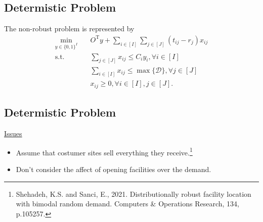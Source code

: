 \documentclass{beamer}
\newcommand{\T}{\mathrm{T}}
\newcommand{\Dcal}{\mathcal{D}}
\begin{document}
\subsection{Determistic Problem}
\begin{frame}[allowframebreaks]
	The non-robust problem is represented by
	\begin{subequations}
		\begin{align*}
			\min_{y \in \{0, 1\}^{I}} &\quad O^\T y + \sum_{i \in [I]} \sum_{j \in [J]} (t_{ij} - r_j) x_{ij} \\
			\text{s.t.} &\quad \sum_{j \in [J]} x_{ij} \le C_i y_i, \forall i \in [I]\\
			&\quad \sum_{i \in [I]} x_{ij} \le \max\{\Dcal\}, \forall j \in [J] \\
			&\quad x_{ij} \ge 0, \forall i \in [I], j \in [J].
		\end{align*}
	\end{subequations}
\end{frame}	

\subsection{Determistic Problem}
\begin{frame}[allowframebreaks]	
	\centering
	\underline{Issues}
	\begin{itemize}
		\item Assume that costumer sites sell everything they receive.\footnote{\tiny Shehadeh, K.S. and Sanci, E., 2021. Distributionally robust facility location with bimodal random demand. Computers \& Operations Research, 134, p.105257.} 
		\item Don't consider the affect of opening facilities over the demand.
	\end{itemize}
\end{frame}
\end{document}
